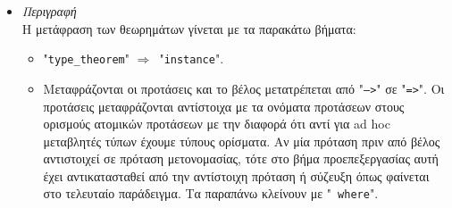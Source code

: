 \documentclass[diploma]{softlab-thesis}
\def\lra{$\Longrightarrow$\ }
\begin{document}
\begin{itemize}
\rule{\linewidth}{0.1pt}

\begin{verbatim}
type_theorem (ListOf(_)s)Has_Internal_App
proof
  apply(_)inside(_) =
    (f(_), cases)
      [] => []
      [head, tail = ...] => f(head) + apply(f(_))inside(tail)
\end{verbatim}

\lra

\begin{verbatim}
instance A'Has_Internal_App ListOf's where
  apply'inside' =
    \(f', pA0) ->
    case pA0 of
      [] -> []
      head : tail -> f'(head) !+ apply'inside'((\pA0 -> f'(pA0)), tail)

\end{verbatim}

\newpage

\begin{verbatim}
type_proposition (@A)And(@B)Have_Eq_And_Gr
equivalent (@A)And(@B)Can_Be_Equal, (@A)Can_Be_Greater_Than(@B)

type_theorem (@A)And(@B)Have_Eq_And_Gr --> (@A)Can_Be_Gr_Or_Eq_To(@B)
proof a >= b = a == b | a > b
\end{verbatim}
$\xRightarrow{\text{προεπεξεργασία}}$\
\begin{verbatim}
type_theorem
  [(@A)And(@B)Can_Be_Equal, (@A)Can_Be_Greater_Than(@B)] -->
  (@A)Can_Be_Gr_Or_Eq_To(@B)
proof a >= b = a == b | a > b
\end{verbatim}
$\xRightarrow{\text{μετάφραση}}$
\begin{verbatim}
instance
  (A'And'Can_Be_Equal b0 b1, A'Can_Be_Greater_Than' b0 b1) =>
  A'Can_Be_Gr_Or_Eq_To' b0 b1
  where
  a !>= b = a !== b !| a !> b
\end{verbatim}

\item
\textit{Περιγραφή} \\

Η μετάφραση των θεωρημάτων γίνεται με τα παρακάτω βήματα:

\begin{itemize}

\item
"\texttt{type_theorem}" \lra "\texttt{instance}".

\item
Μεταφράζονται οι προτάσεις και το βέλος μετατρέπεται από "\texttt{-->}" σε
"\texttt{=>}". Οι προτάσεις μεταφράζονται αντίστοιχα με τα ονόματα προτάσεων
στους ορισμούς ατομικών προτάσεων με την διαφορά ότι αντί για ad hoc μεταβλητές
τύπων έχουμε τύπους ορίσματα. Αν μία πρόταση πριν από βέλος αντιστοιχεί σε
πρόταση μετονομασίας, τότε στο βήμα προεπεξεργασίας αυτή έχει αντικατασταθεί
από την αντίστοιχη πρόταση ή σύζευξη όπως φαίνεται στο τελευταίο παράδειγμα.
Τα παραπάνω κλείνουν με "\texttt{ where}".


\end{itemize}
\end{itemize}
\end{document}
